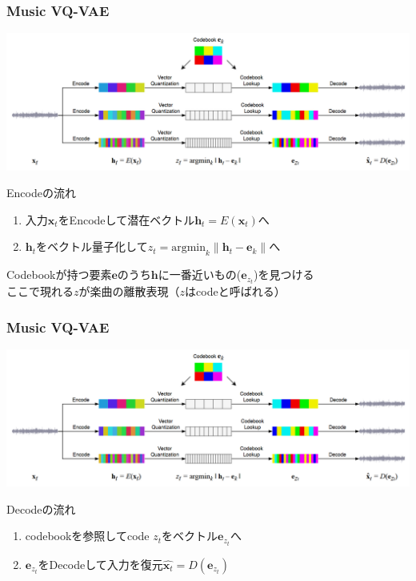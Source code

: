 \documentclass[dvipdfmx]{beamer}
\begin{document}
\begin{frame}
    \frametitle{Music VQ-VAE}
    \begin{center}
        \includegraphics[scale=0.2]{figure/musicvqvae.png}
    \end{center}

    Encodeの流れ
    \begin{enumerate}
        \item 入力$\bm{x}_t$をEncodeして潜在ベクトル$\bm{h}_t = E(\bm{x}_t)$へ
        \item $\bm{h}_t$をベクトル量子化して$z_t = \mathrm{argmin}_k \|\bm{h}_t - \bm{e}_k\|$へ\\
    \end{enumerate}
    \vspace{0.5\baselineskip}

    Codebookが持つ要素$\bm{e}$のうち$\bm{h}$に一番近いもの($\bm{e}_{z_t}$)を見つける\\
    ここで現れる$z$が楽曲の離散表現（$z$はcodeと呼ばれる）
\end{frame}


\begin{frame}
    \frametitle{Music VQ-VAE}
    \begin{center}
        \includegraphics[scale=0.2]{figure/musicvqvae.png}
    \end{center}

    Decodeの流れ
   \begin{enumerate}
       \item codebookを参照してcode $z_t$をベクトル$\bm{e}_{z_t}$へ
       \item $\bm{e}_{z_t}$をDecodeして入力を復元$\hat{\bm{x}_{t}} = D(\bm{e}_{z_t})$
   \end{enumerate}
\end{frame}
\end{document}
